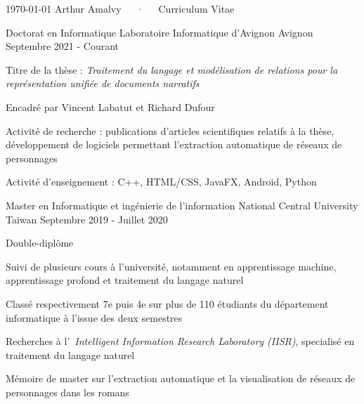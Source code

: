 \documentclass[12pt, a4paper]{awesome-cv}
\begin{document}
\makecvheader

\makecvfooter
  {\today}
  {Arthur Amalvy~~~·~~~Curriculum Vitae}
  {\thepage}




\begin{cventries}

  \cventry
  {Doctorat en Informatique} %
  {Laboratoire Informatique d'Avignon} %
  {Avignon} %
  {Septembre 2021 - Courant} %
  {
    \begin{cvitems} %
      \item Titre de la thèse : \textit{Traitement du langage et modélisation de relations pour la représentation unifiée de documents narratifs}
      \item Encadré par Vincent Labatut et Richard Dufour
      \item Activité de recherche : publications d'articles scientifiques relatifs à la thèse, développement de logiciels permettant l'extraction automatique de réseaux de personnages
      \item Activité d'enseignement : C++, HTML/CSS, JavaFX, Android, Python
    \end{cvitems}
  }

  \cventry
  {Master en Informatique et ingénierie de l'information} %
  {National Central University} %
  {Taiwan} %
  {Septembre 2019 - Juillet 2020} %
  {
    \begin{cvitems} %
      \item Double-diplôme
      \item Suivi de plusieurs cours à l'université, notamment en apprentissage machine, apprentissage profond et traitement du langage naturel
      \item Classé respectivement 7e puis 4e sur plus de 110 étudiants du département informatique à l'issue des deux semestres
      \item Recherches à l'~\textit{Intelligent Information Research Laboratory (IISR)}, specialisé en traitement du langage naturel
      \item Mémoire de master sur l'extraction automatique et la visualisation de réseaux de personnages dans les romans
    \end{cvitems}
  }


\end{cventries}
\end{document}
